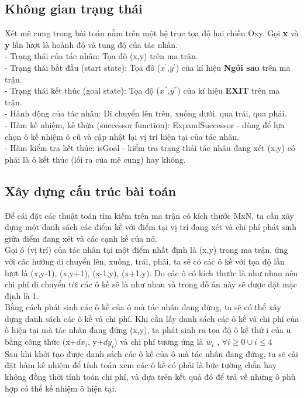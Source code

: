 \documentclass[11pt]{scrartcl} %
\begin{document}
\subsection{Không gian trạng thái}
Xét mê cung trong bài toán nằm trên một hệ trục tọa độ hai chiều Oxy. Gọi \textbf{x} và \textbf{y} lần lượt là hoành độ và tung độ của tác nhân.\\
- Trạng thái của tác nhân: Tọa độ (x,y) trên ma trận.\\
- Trạng thái bắt đầu (start state): Tọa đô ($x^{'}$,$y^{'}$) của kí hiệu \textbf{Ngôi sao} trên ma trận.\\
- Trạng thái kết thúc (goal state): Tọa độ ($x^{''}$,$y^{''}$) của kí hiệu \textbf{EXIT} trên ma trận.\\
- Hành động của tác nhân: Di chuyển lên trên, xuống dưới, qua trái, qua phải.\\
- Hàm kế nhiệm, kế thừa (successor function): ExpandSuccessor - dùng để lựa chọn ô kế nhiệm ô cũ và cập nhật lại vị trí hiện tại của tác nhân.\\
- Hàm kiểm tra kết thúc: isGoal - kiểm tra trạng thái tác nhân đang xét (x,y) có phải là ô kết thúc (lối ra của mê cung) hay không.
\subsection{Xây dựng cấu trúc bài toán}
Để cái đặt các thuật toán tìm kiếm trên ma trận có kích thước MxN, ta cần xây dựng một danh sách các điểm kề với điểm tại vị trí đang xét và chi phí phát sinh giữa điểm đang xét và các cạnh kề của nó.\\

Gọi ô (vị trí) của tác nhân tại một điểm nhất định là (x,y) trong ma trận, ứng với các hướng di chuyển lên, xuống, trái, phải, ta sẽ có các ô kề với tọa độ lần lượt là (x,y-1), (x,y+1), (x-1,y), (x+1,y). Do các ô có kích thước là như nhau nên chi phí di chuyển tới các ô kề sẽ là như nhau và trong đồ án này sẽ được đặt mặc định là 1.\\

Bằng cách phát sinh các ô kề của ô mà tác nhân đang đứng, ta sẽ có thể xây dựng danh sách các ô kề và chi phí. Khi cần lấy danh sách các ô kề và chi phí của ô hiện tại mà tác nhân đang đứng (x,y), ta phát sinh ra tọa độ ô kề thứ i của u bằng công thức (x+$dx_{i}$, y+$dy_{i}$) và chi phí tương ứng là $w_{i}$ , $\forall{i\ge0}\cup{i\le4}$\\

Sau khi khởi tạo được danh sách các ô kề của ô mà tác nhân đang đứng, ta sẽ cài đặt hàm kế nhiệm để tính toán xem các ô kề có phải là bức tường chắn hay không đồng thời tính toán chi phí, và dựa trên kết quả đó để trả về những ô phù hợp có thể kế nhiệm ô hiện tại.
\end{document}
